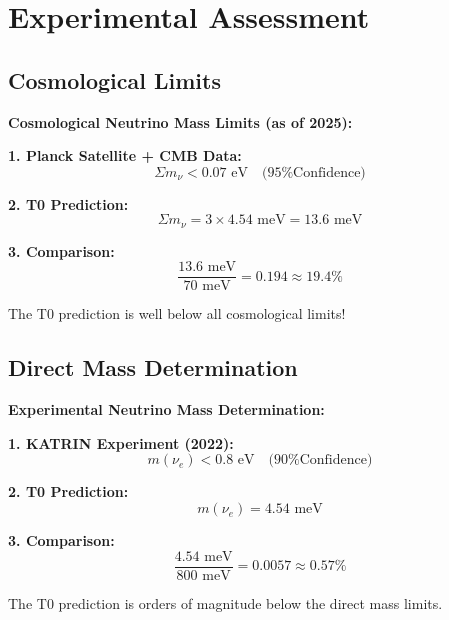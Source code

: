 \documentclass[12pt,a4paper]{article}
\begin{document}
	\section{Experimental Assessment}
	
	\subsection{Cosmological Limits}
	
	\begin{experimental}
		\textbf{Cosmological Neutrino Mass Limits (as of 2025):}
		
		\textbf{1. Planck Satellite + CMB Data:}
		\begin{equation}
			\Sigma m_\nu < 0.07 \text{ eV} \quad \text{(95\% Confidence)}
		\end{equation}
		
		\textbf{2. T0 Prediction:}
		\begin{equation}
			\Sigma m_\nu = 3 \times 4.54 \text{ meV} = 13.6 \text{ meV}
		\end{equation}
		
		\textbf{3. Comparison:}
		\begin{equation}
			\frac{13.6 \text{ meV}}{70 \text{ meV}} = 0.194 \approx 19.4\%
		\end{equation}
		
		The T0 prediction is well below all cosmological limits!
	\end{experimental}
	
	\subsection{Direct Mass Determination}
	
	\begin{experimental}
		\textbf{Experimental Neutrino Mass Determination:}
		
		\textbf{1. KATRIN Experiment (2022):}
		\begin{equation}
			m(\nu_e) < 0.8 \text{ eV} \quad \text{(90\% Confidence)}
		\end{equation}
		
		\textbf{2. T0 Prediction:}
		\begin{equation}
			m(\nu_e) = 4.54 \text{ meV}
		\end{equation}
		
		\textbf{3. Comparison:}
		\begin{equation}
			\frac{4.54 \text{ meV}}{800 \text{ meV}} = 0.0057 \approx 0.57\%
		\end{equation}
		
		The T0 prediction is orders of magnitude below the direct mass limits.
	\end{experimental}
	
\end{document}
